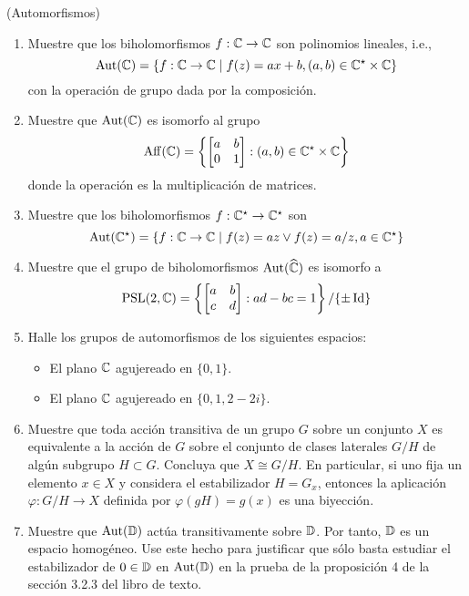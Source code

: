 \begin{exercise}
(Automorfismos)

\begin{enumerate}[label=\alph*)]
    \item Muestre que los biholomorfismos $f : \mathbb C \to \mathbb C$ son polinomios lineales, i.e.,
    $$\operatorname{Aut}(\mathbb C) = \{ f : \mathbb C \to \mathbb C \mid f(z) = ax + b, (a, b) \in \mathbb C^\star \times \mathbb C \}$$
    con la operación de grupo dada por la composición.
    
    \item Muestre que $\operatorname{Aut}(\mathbb C)$ es isomorfo al grupo
    $$\operatorname{Aff}(\mathbb C) = \left \{ \begin{bmatrix}  a & b \\ 0 & 1  \end{bmatrix} : (a, b) \in \mathbb C^\star \times \mathbb C \right \}$$
    donde la operación es la multiplicación de matrices.
    
    \item Muestre que los biholomorfismos $f : \mathbb C^\star \to \mathbb C^\star$ son
    $$\operatorname{Aut}(\mathbb C^\star) = \{ f : \mathbb C \to \mathbb C \mid f(z) = az \vee f(z) = a/z, a \in \mathbb C^\star \}$$
    
    \item Muestre que el grupo de biholomorfismos $\operatorname{Aut}(\widehat {\mathbb C})$ es isomorfo a
    $$\operatorname{PSL}(2, \mathbb C) = \left \{ \begin{bmatrix}  a & b \\ c & d  \end{bmatrix} : ad - bc = 1 \right \} / \{ \pm \operatorname{Id} \}$$
    
    \item Halle los grupos de automorfismos de los siguientes espacios:
    \begin{itemize}
        \item El plano $\mathbb C$ agujereado en $\{ 0, 1 \}$.
        \item El plano $\mathbb C$ agujereado en $\{ 0, 1, 2 - 2i \}$.
    \end{itemize}
    
    \item Muestre que toda acción transitiva de un grupo $G$ sobre un conjunto $X$ es equivalente a la acción de $G$ sobre el conjunto de clases laterales $G/H$ de algún subgrupo $H \subset G$. Concluya que $X \cong G/H$. En particular, si uno fija un elemento $x \in X$ y considera el estabilizador $H = G_x$, entonces la aplicación $\varphi : G/H \to X$ definida por $\varphi(gH) = g(x)$ es una biyección.
    
    \item Muestre que $\operatorname{Aut}(\mathbb D)$ actúa transitivamente sobre $\mathbb D$. Por tanto, $\mathbb D$ es un espacio homogéneo. Use este hecho para justificar que sólo basta estudiar el estabilizador de $0 \in \mathbb D$ en $\operatorname{Aut}(\mathbb D)$ en la prueba de la proposición 4 de la sección 3.2.3 del libro de texto.
\end{enumerate}
\end{exercise}

